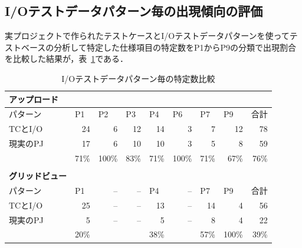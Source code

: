 \subsection{I/Oテストデータパターン毎の出現傾向の評価}
実プロジェクトで作られたテストケースとI/Oテストデータパターンを使ってテストベースの分析して特定した仕様項目の特定数をP1からP9の分類で出現割合を比較した結果が，表~\ref{tab:D-4-IOtestcompare}である．
\begin{table}[htbp]
  \centering
  \caption{I/Oテストデータパターン毎の特定数比較}
    \begin{tabular}{rrrrrrrrr}
    \multicolumn{1}{l}{\textbf{アップロード}} &  &     &       &       &       &       &       &  \bigstrut[b]\\
    \hline
    \multicolumn{1}{|l|}{パターン} &\multicolumn{1}{|l|}{P1} & \multicolumn{1}{l|}{P2} & \multicolumn{1}{l|}{P3} & \multicolumn{1}{l|}{P4} & \multicolumn{1}{l|}{P6} & \multicolumn{1}{l|}{P7} & \multicolumn{1}{l|}{P9} & \multicolumn{1}{l|}{合計} \bigstrut\\
    \hline
    \hline
    \multicolumn{1}{|l|}{TCとI/O} &\multicolumn{1}{|r|}{24} & \multicolumn{1}{r|}{6} & \multicolumn{1}{r|}{12} & \multicolumn{1}{r|}{14} & \multicolumn{1}{r|}{3} & \multicolumn{1}{r|}{7} & \multicolumn{1}{r|}{12} & \multicolumn{1}{r|}{78} \bigstrut\\
    \hline
    \multicolumn{1}{|l|}{現実のPJ} &\multicolumn{1}{|r|}{17} & \multicolumn{1}{r|}{6} & \multicolumn{1}{r|}{10} & \multicolumn{1}{r|}{10} & \multicolumn{1}{r|}{3} & \multicolumn{1}{r|}{5} & \multicolumn{1}{r|}{8} & \multicolumn{1}{r|}{59} \bigstrut\\
    \hline
    &71\%  & 100\% & 83\%  & 71\%  & 100\% & 71\%  & 67\%  & 76\% \bigstrut[t]\\
          &       &       &       &       &       &       &  \\
    \multicolumn{1}{l}{\textbf{グリッドビュー}}  & &       &       &       &       &       &       &  \bigstrut[b]\\
    \hline
    \multicolumn{1}{|l|}{パターン} &\multicolumn{1}{|l|}{P1} & \multicolumn{1}{r|}{--} & \multicolumn{1}{r|}{--} & \multicolumn{1}{l|}{P4} & \multicolumn{1}{r|}{--} & \multicolumn{1}{l|}{P7} & \multicolumn{1}{l|}{P9} & \multicolumn{1}{l|}{合計} \bigstrut\\
    \hline
    \hline
    \multicolumn{1}{|l|}{TCとI/O} &\multicolumn{1}{|r|}{25} & \multicolumn{1}{r|}{--} & \multicolumn{1}{r|}{--} & \multicolumn{1}{r|}{13} & \multicolumn{1}{r|}{--} & \multicolumn{1}{r|}{14} & \multicolumn{1}{r|}{4} & \multicolumn{1}{r|}{56} \bigstrut\\
    \hline
    \multicolumn{1}{|l|}{現実のPJ} &\multicolumn{1}{|r|}{5} & \multicolumn{1}{r|}{--} & \multicolumn{1}{r|}{--} & \multicolumn{1}{r|}{5} & \multicolumn{1}{r|}{--} & \multicolumn{1}{r|}{8} & \multicolumn{1}{r|}{4} & \multicolumn{1}{r|}{22} \bigstrut\\
    \hline
    &20\%  &       &       & 38\%  &       & 57\%  & 100\% & 39\% \bigstrut[t]\\
    \end{tabular}%
  \label{tab:D-4-IOtestcompare}%
\end{table}%

